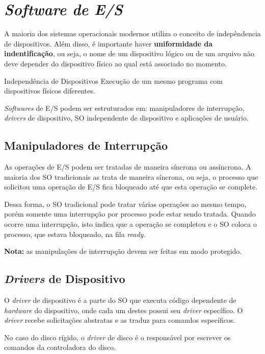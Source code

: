 \section{\textit{Software de E/S}}
A maioria dos sistemas operacionais modernos utiliza o conceito de indepêndencia de dispositivos. Além disso, é importante haver \textbf{uniformidade da indentificação}, ou seja, o nome de um dispositivo lógico ou de um arquivo não deve depender do dispositivo físico ao qual está associado no momento.

\begin{definicao}{Independência de Dispositivos}
  Execução de um mesmo programa com dispositivos físicos diferentes.
\end{definicao}

\textit{Softwares} de E/S podem ser estruturados em: manipuladores de interrupção, \textit{drivers} de dispositivo, SO independente de dispositivo e aplicações de usuário.





\subsection{Manipuladores de Interrupção}
As operações de E/S podem ser tratadas de maneira síncrona ou assíncrona. A maioria dos SO tradicionais as trata de maneira síncrona, ou seja, o processo que solicitou uma operação de E/S fica bloqueado até que esta operação se complete.

Dessa forma, o SO tradicional pode tratar várias operações ao mesmo tempo, porém somente uma interrupção por processo pode estar sendo tratada. Quando ocorre uma interrupção, isto indica que a operação se completou e o SO coloca o processo, que estava bloqueado, na fila \textit{ready}.

\textbf{Nota:} as manipulações de interrupção devem ser feitas em modo protegido.




\subsection{\textit{Drivers} de Dispositivo}
O \textit{driver} de dispositivo é a parte do SO que executa código dependente de \textit{hardware} do dispositivo, onde cada um destes possui seu \textit{driver} específico. O \textit{driver} recebe solicitações abstratas e as traduz para comandos específicos.

No caso do disco rígido, o \textit{driver} de disco é o responsável por escrever os comandos da controladora do disco.




